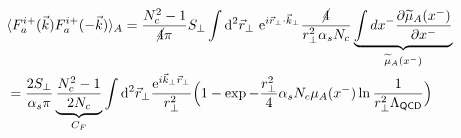 \begin{note}
\begin{fullwidth}
    \begin{align*}
        &\langle F_{a}^{i+}(\vec{k}) F_{a}^{i+}(-\vec{k})\rangle_A=\frac{N_c^2-1}{\cancel{4}\pi}S_\perp\int \mathrm{d}^{2} \vec{r}_\perp \text{  }\mathrm{e}^{i\vec{r}_\perp \cdot \vec{k}_\perp}\frac{\cancel{4}}{r_\perp^2\alpha_sN_c}\underbrace{\int dx^-\frac{\partial\widetilde{\mu}_A(x^-)}{\partial x^-}}_{\widetilde{\mu}_A(x^-)}\\
        &=\frac{2S_\perp}{\alpha_s\pi}\underbrace{\frac{N_c^2-1}{2N_c}}_{C_F}\int\mathrm{d}^2\vec{r}_\perp\frac{\mathrm{e}^{i\vec{k}_\perp\vec{r}_\perp}}{r_\perp^2}\Big(1-\exp{-\frac{r_\perp^2}{4}\alpha_sN_c\mu_A(x^-)\ln{\frac{1}{r_\perp^2\Lambda_{\textsf{QCD}}}}}\Big)
    \end{align*}
    \end{fullwidth}
\end{note}

